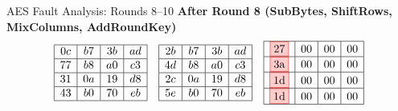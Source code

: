 \documentclass{beamer}
\newenvironment{tres important}[2][]{
	\setkeys{EmphEqEnv}{#2}
	\setkeys{EmphEqOpt}{box={\setlength{\fboxsep}{10pt}\fcolorbox{myNewColorA}{white}},#1}
	\EmphEqMainEnv}
{\endEmphEqMainEnv}
\begin{document}
\begin{frame}[fragile]{AES Fault Analysis: Rounds 8–10}
    \vspace{1mm}
    \textbf{After Round 8 (SubBytes, ShiftRows, MixColumns, AddRoundKey)}
    \[
    \begin{array}{ccc}
    \begin{array}{|c|c|c|c|} \hline
    0c & b7 & 3b & ad \\ \hline
    77 & b8 & a0 & c3 \\ \hline
    31 & 0a & 19 & d8 \\ \hline
    43 & b0 & 70 & eb \\ \hline
    \end{array}
    &
    \begin{array}{|c|c|c|c|} \hline
    2b & b7 & 3b & ad \\ \hline
    4d & b8 & a0 & c3 \\ \hline
    2c & 0a & 19 & d8 \\ \hline
    5e & b0 & 70 & eb \\ \hline
    \end{array}
    &
    \begin{array}{|c|c|c|c|} \hline
    \fcolorbox{red}{red!20}{27} & 00 & 00 & 00 \\ \hline
    \fcolorbox{red}{red!20}{3a} & 00 & 00 & 00 \\ \hline
    \fcolorbox{red}{red!20}{1d} & 00 & 00 & 00 \\ \hline
    \fcolorbox{red}{red!20}{1d} & 00 & 00 & 00 \\ \hline
    \end{array}
    \end{array}
    \]
    \end{frame}
\end{document}
